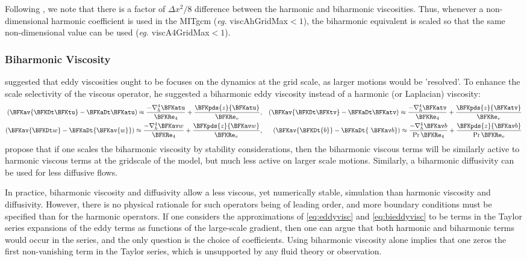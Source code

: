 Following \cite{grha00}, we note that there is a factor of $\Delta
x^2/8$ difference between the harmonic and biharmonic viscosities.
Thus, whenever a non-dimensional harmonic coefficient is used in the
MITgcm (\textit{eg.} {\sf viscAhGridMax}$<1$), the biharmonic equivalent is
scaled so that the same non-dimensional value can be used (\textit{eg.} {\sf
  viscA4GridMax}$<1$).

\subsubsection{Biharmonic Viscosity}
\cite{ho78} suggested that eddy viscosities ought to be focuses on
the dynamics at the grid scale, as larger motions would be 'resolved'.
To enhance the scale selectivity of the viscous operator, he suggested
a biharmonic eddy viscosity instead of a harmonic (or Laplacian)
viscosity:
\begin{eqnarray}
\left({\BFKav{\BFKDt \BFKtu}}-{\BFKaDt \BFKatu}\right)\approx
\frac{-\nabla^4_h{\BFKatu}}{\BFKRe_4}
+\frac{\BFKpds{z}{\BFKatu}}{\BFKRe_v}\label{eq:bieddyvisc}, & &
\left({\BFKav{\BFKDt \BFKtv}}-{\BFKaDt \BFKatv}\right)\approx
\frac{-\nabla^4_h{\BFKatv}}{\BFKRe_4}
+\frac{\BFKpds{z}{\BFKatv}}{\BFKRe_v}\nonumber\\
\left(\BFKav{\BFKDt w}-\BFKaDt
  {\BFKav{w}}\right)\approx\frac{-\nabla^4_h\BFKav
  w}{\BFKRe_4}+\frac{\BFKpds{z}{\BFKav w}}{\BFKRe_v}\nonumber, & &
\left(\BFKav{\BFKDt{b}}-\BFKaDt{\ \BFKav b} \right)\approx
\frac{-\nabla^4_h \BFKav b}{\Pr\BFKRe_4}
+\frac{\BFKpds{z} {\BFKav b}}{\Pr\BFKRe_v}\nonumber
\end{eqnarray}
\cite{grha00} propose that if one scales the biharmonic viscosity by
stability considerations, then the biharmonic viscous terms will be
similarly active to harmonic viscous terms at the gridscale of the
model, but much less active on larger scale motions.  Similarly, a
biharmonic diffusivity can be used for less diffusive flows.

In practice, biharmonic viscosity and diffusivity allow a less
viscous, yet numerically stable, simulation than harmonic viscosity
and diffusivity.  However, there is no physical rationale for such
operators being of leading order, and more boundary conditions must be
specified than for the harmonic operators. If one considers the
approximations of \ref{eq:eddyvisc} and \ref{eq:bieddyvisc} to be
terms in the Taylor series expansions of the eddy terms as functions
of the large-scale gradient, then one can argue that both harmonic and
biharmonic terms would occur in the series, and the only question is
the choice of coefficients.  Using biharmonic viscosity alone implies
that one zeros the first non-vanishing term in the Taylor series,
which is unsupported by any fluid theory or observation.

